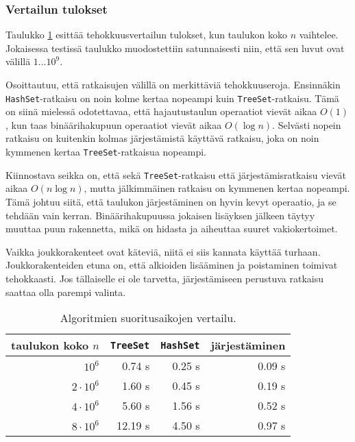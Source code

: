 \subsubsection{Vertailun tulokset}

Taulukko \ref{tab:eriver} esittää tehokkuusvertailun tulokset,
kun taulukon koko $n$ vaihtelee.
Jokaisessa testissä taulukko muodostettiin satunnaisesti niin,
että sen luvut ovat välillä $1 \dots 10^9$.

Osoittautuu, että ratkaisujen välillä on merkittäviä tehokkuuseroja.
Ensinnäkin \texttt{HashSet}-ratkaisu on noin kolme kertaa
nopeampi kuin \texttt{TreeSet}-ratkaisu.
Tämä on siinä mielessä odotettavaa, että hajautustaulun
operaatiot vievät aikaa $O(1)$, kun taas binäärihakupuun
operaatiot vievät aikaa $O(\log n)$.
Selvästi nopein ratkaisu on kuitenkin kolmas järjestämistä
käyttävä ratkaisu, joka on noin kymmenen kertaa
\texttt{TreeSet}-ratkaisua nopeampi.

Kiinnostava seikka on, että sekä \texttt{TreeSet}-ratkaisu että
järjestämisratkaisu vievät aikaa $O(n \log n)$, mutta
jälkimmäinen ratkaisu on kymmenen kertaa nopeampi.
Tämä johtuu siitä, että taulukon järjestäminen on hyvin kevyt
operaatio, ja se tehdään vain kerran.
Binäärihakupuussa jokaisen lisäyksen jälkeen täytyy muuttaa
puun rakennetta, mikä on hidasta ja aiheuttaa suuret vakiokertoimet.

Vaikka joukkorakenteet ovat käteviä, niitä ei siis kannata
käyttää turhaan.
Joukkorakenteiden etuna on, että alkioiden lisääminen ja poistaminen
toimivat tehokkaasti.
Jos tällaiselle ei ole tarvetta, järjestämiseen perustuva ratkaisu
saattaa olla parempi valinta.

\begin{table}
\center
\begin{tabular}{rrrr}
taulukon koko $n$ & \texttt{TreeSet} & \texttt{HashSet} & järjestäminen \\
\hline
$10^6$ & 0.74 s & 0.25 s & 0.09 s \\
$2 \cdot 10^6$ & 1.60 s & 0.45 s & 0.19 s \\
$4 \cdot 10^6$ & 5.60 s & 1.56 s & 0.52 s \\
$8 \cdot 10^6$ & 12.19 s & 4.50 s & 0.97 s \\
\end{tabular}
\caption{Algoritmien suoritusaikojen vertailu.}
\label{tab:eriver}
\end{table}

